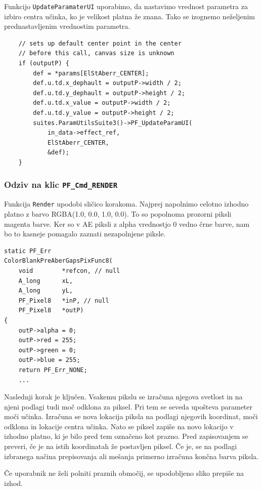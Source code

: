 \documentclass[a4paper, 12pt]{book}
\begin{document}
Funkcijo \verb!UpdateParamaterUI! uporabimo, da nastavimo vrednost parametra za izbiro centra učinka,
ko je velikost platna že znana.
Tako se izognemo neželjenim prednastavljenim vrednostim parametra.

\begin{verbatim}
    // sets up default center point in the center
    // before this call, canvas size is unknown 
    if (outputP) { 
        def = *params[ElStAberr_CENTER];
        def.u.td.x_dephault = outputP->width / 2;
        def.u.td.y_dephault = outputP->height / 2;
        def.u.td.x_value = outputP->width / 2;
        def.u.td.y_value = outputP->height / 2;
        suites.ParamUtilsSuite3()->PF_UpdateParamUI(
            in_data->effect_ref,
            ElStAberr_CENTER,
            &def);
    }
\end{verbatim}

\subsubsection{Odziv na klic \texttt{PF\_Cmd\_RENDER}}

Funkcija \verb!Render! upodobi sličico korakoma.
Najprej napolnimo celotno izhodno platno z barvo RGBA(1.0, 0.0, 1.0, 0.0).
To so popolnoma prozorni piksli magenta barve.
Ker so v AE piksli z alpha vrednostjo 0 vedno črne barve, nam bo to kasneje pomagalo zaznati nezapolnjene piksle.

\begin{verbatim}
static PF_Err
ColorBlankPreAberGapsPixFunc8(
    void        *refcon, // null
    A_long      xL,
    A_long      yL,
    PF_Pixel8   *inP, // null
    PF_Pixel8   *outP)
{
    outP->alpha = 0;
    outP->red = 255;
    outP->green = 0;
    outP->blue = 255;
    return PF_Err_NONE;
    ...
\end{verbatim}

Naslednji korak je ključen. 
Vsakemu pikslu se izračuna njegova svetlost in na njeni podlagi tudi moč odklona za piksel.
Pri tem se seveda upošteva parameter moči učinka.
Izračuna se nova lokacija piksla na podlagi njegovih koordinat, moči odklona in lokacije centra učinka.
Nato se piksel zapiše na novo lokacijo v izhodno platno, ki je bilo pred tem označeno kot prazno.
Pred zapisovanjem se preveri, če je na istih koordinatah že postavljen piksel.
Če je, se na podlagi izbranega načina prepisovanja ali mešanja primerno izračuna končna barva piksla.

Če uporabnik ne želi polniti praznih območij, se upodobljeno sliko prepiše na izhod.
\end{document}
